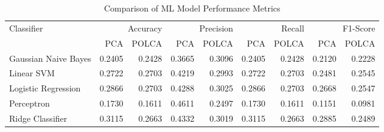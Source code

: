 \begin{table}[htbp]
\caption{Comparison of ML Model Performance Metrics}
\label{tab:model_comparison}
\begin{tabular}{lrrrrrrrr}
\toprule
Classifier & \multicolumn{2}{r}{Accuracy} & \multicolumn{2}{r}{Precision} & \multicolumn{2}{r}{Recall} & \multicolumn{2}{r}{F1-Score} \\
 & PCA & POLCA & PCA & POLCA & PCA & POLCA & PCA & POLCA \\
\midrule
Gaussian Naive Bayes & 0.2405 & 0.2428 & 0.3665 & 0.3096 & 0.2405 & 0.2428 & 0.2120 & 0.2228 \\
Linear SVM & 0.2722 & 0.2703 & 0.4219 & 0.2993 & 0.2722 & 0.2703 & 0.2481 & 0.2545 \\
Logistic Regression & 0.2866 & 0.2703 & 0.4288 & 0.3025 & 0.2866 & 0.2703 & 0.2668 & 0.2547 \\
Perceptron & 0.1730 & 0.1611 & 0.4611 & 0.2497 & 0.1730 & 0.1611 & 0.1151 & 0.0981 \\
Ridge Classifier & 0.3115 & 0.2663 & 0.4332 & 0.3019 & 0.3115 & 0.2663 & 0.2885 & 0.2489 \\
\bottomrule
\end{tabular}
\end{table}
